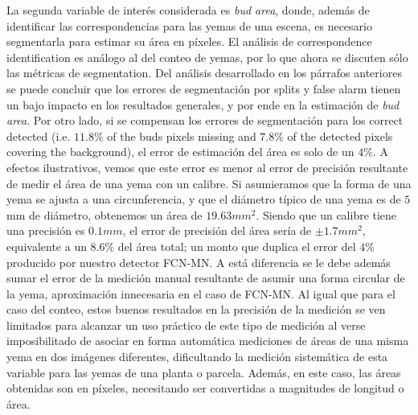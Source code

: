 \documentclass[a4paper,authoryear,review]{elsarticle}
\begin{document}
%
La segunda variable de interés considerada es \emph{bud area}, donde, además de identificar las correspondencias para las yemas de una escena, es necesario segmentarla para estimar su área en píxeles. El análisis de correspondence identification es análogo al del conteo de yemas, por lo que ahora se discuten sólo las métricas de segmentation. Del análisis desarrollado en los párrafos anteriores se puede concluir que los errores de segmentación por splits y false alarm tienen un bajo impacto en los resultados generales, y por ende en la estimación de \emph{bud area}. Por otro lado, si se compensan los errores de segmentación para los correct detected (i.e. $11.8\%$ of the buds pixels missing and $7.8\%$ of the detected pixels covering the background), el error de estimación del área es solo de un $4\%$. A efectos ilustrativos, vemos que este error es menor al error de precisión resultante de medir el área de una yema con un calibre. Si asumieramos que la forma de una yema se ajusta a una circunferencia, y que el diámetro típico de una yema es de $5$ mm de diámetro, obtenemos un área de $19.63 mm^2$. Siendo que un calibre tiene una precisión es $0.1 mm$, el error de precisión del área sería de $\pm 1.7 mm^2$, equivalente a un $8.6\%$ del área total; un monto que duplica el error del $4\%$ producido por nuestro detector FCN-MN. A está diferencia se le debe además sumar el error de la medición manual resultante de asumir una forma circular de la yema, aproximación innecesaria en el caso de FCN-MN.
%
Al igual que para el caso del conteo, estos buenos resultados en la precisión de la medición se ven limitados  para alcanzar un uso práctico de este tipo de medición al verse imposibilitado de asociar en forma automática mediciones de áreas de una misma yema en dos imágenes diferentes, dificultando  la medición sistemática de esta variable para las yemas de una planta o parcela. Además, en este caso, las áreas obtenidas son en píxeles, necesitando ser convertidas a magnitudes de longitud o área.
\end{document}
